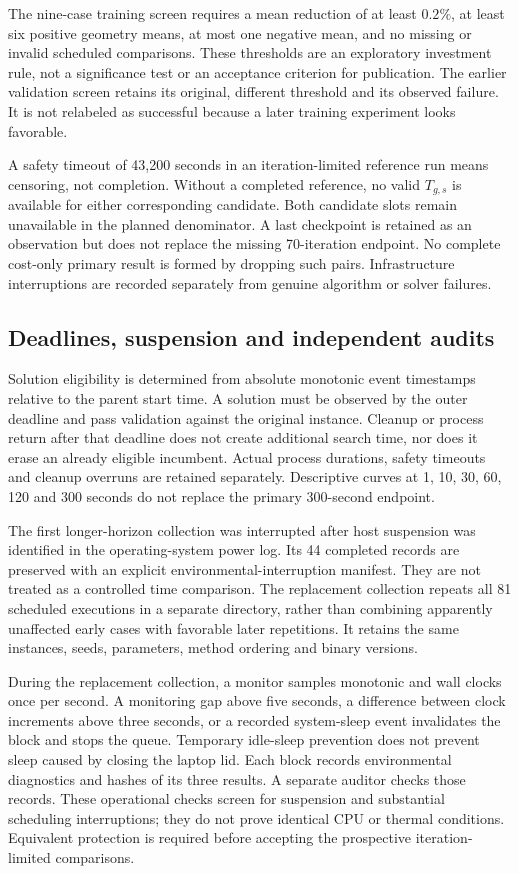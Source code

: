 The nine-case training screen requires a mean reduction of at least
$0.2\%$, at least six positive geometry means, at most one negative mean,
and no missing or invalid scheduled comparisons. These thresholds are an
exploratory investment rule, not a significance test or an acceptance
criterion for publication. The earlier validation screen retains its
original, different threshold and its observed failure. It is not relabeled
as successful because a later training experiment looks favorable.

A safety timeout of 43,200 seconds in an iteration-limited reference run
means censoring, not completion. Without a completed reference, no valid
$T_{g,s}$ is available for either corresponding candidate. Both candidate
slots remain unavailable in the planned denominator. A last checkpoint is
retained as an observation but does not replace the missing 70-iteration
endpoint. No complete cost-only primary result is formed by dropping such
pairs. Infrastructure interruptions are recorded separately from genuine
algorithm or solver failures.

\subsection{Deadlines, suspension and independent audits}
Solution eligibility is determined from absolute monotonic event timestamps
relative to the parent start time. A solution must be observed by the outer
deadline and pass validation against the original instance. Cleanup or process return after that deadline does
not create additional search time, nor does it erase an already eligible
incumbent. Actual process durations, safety timeouts and cleanup overruns
are retained separately. Descriptive curves at 1, 10, 30, 60, 120 and
300 seconds do not replace the primary 300-second endpoint.

The first longer-horizon collection was interrupted after host suspension
was identified in the operating-system power log. Its 44 completed records
are preserved with an explicit environmental-interruption manifest. They
are not treated as a controlled time comparison. The replacement collection
repeats all 81 scheduled executions in a separate directory, rather than
combining apparently unaffected early cases with favorable later repetitions.
It retains the same instances, seeds, parameters, method ordering and binary
versions.

During the replacement collection, a monitor samples monotonic and wall
clocks once per second. A monitoring gap above five seconds, a difference
between clock increments above three seconds, or a recorded system-sleep
event invalidates the block and stops the queue. Temporary idle-sleep
prevention does not prevent sleep caused by closing the laptop lid.
Each block records environmental diagnostics and hashes of its three
results. A separate auditor checks those records. These operational checks
screen for suspension and substantial scheduling interruptions; they do not
prove identical CPU or thermal conditions. Equivalent protection is required
before accepting the prospective iteration-limited comparisons.

